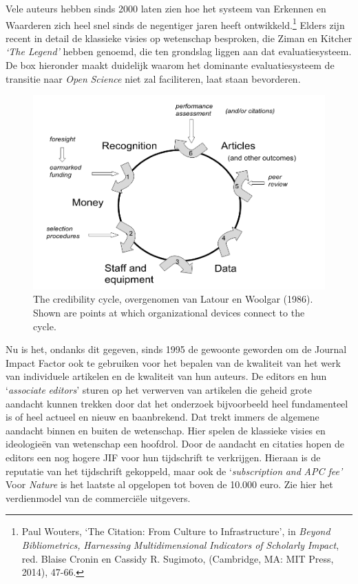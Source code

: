 \documentclass[smallauthor, chapterhaspagenum, nochapterinheader, pagenuminheader,  bigchapnum,medium2, tocpages,  garamond, titleinheader]{jote-book}
\begin{document}
	Vele auteurs hebben sinds 2000 laten zien hoe het systeem van Erkennen en Waarderen zich heel snel sinds de negentiger jaren heeft ontwikkeld.\footnote{Paul Wouters, ‘The Citation: From Culture to Infrastructure', in \emph{Beyond }\emph{Bibliometrics}\emph{, }\emph{Harnessing}\emph{ }\emph{Multidimensional}\emph{ Indicators of }\emph{Scholarly}\emph{ Impact}, red. Blaise Cronin en Cassidy R. Sugimoto, (Cambridge, MA: MIT Press, 2014), 47-66.} Elders zijn recent in detail de klassieke visies op wetenschap besproken, die Ziman en Kitcher \emph{‘The Legend'} hebben genoemd, die ten grondslag liggen aan dat evaluatiesysteem. De box hieronder maakt duidelijk waarom het dominante evaluatiesysteem de transitie naar \emph{Open }\emph{Science} niet zal faciliteren, laat staan bevorderen.



	\begin{figure}
		\includegraphics[width=\linewidth]{media/image2.png}



		\label{fig:rId16}



		\caption{The credibility cycle, overgenomen van Latour en Woolgar (1986). Shown are points at which organizational devices connect to the cycle.}
	\end{figure}



	Nu is het, ondanks dit gegeven, sinds 1995 de gewoonte geworden om de Journal Impact Factor ook te gebruiken voor het bepalen van de kwaliteit van het werk van individuele artikelen en de kwaliteit van hun auteurs. De editors en hun ‘\emph{associate}\emph{ editors}' sturen op het verwerven van artikelen die geheid grote aandacht kunnen trekken door dat het onderzoek bijvoorbeeld heel fundamenteel is of heel actueel en nieuw en baanbrekend. Dat trekt immers de algemene aandacht binnen en buiten de wetenschap. Hier spelen de klassieke visies en ideologieën van wetenschap een hoofdrol. Door de aandacht en citaties hopen de editors een nog hogere JIF voor hun tijdschrift te verkrijgen. Hieraan is de reputatie van het tijdschrift gekoppeld, maar ook de ‘\emph{subscription}\emph{ }\emph{and}\emph{ APC fee'} Voor \emph{Nature} is het laatste al opgelopen tot boven de 10.000 euro. Zie hier het verdienmodel van de commerciële uitgevers.
\end{document}
